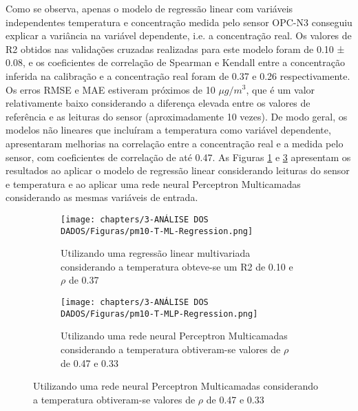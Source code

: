 Como se observa, apenas o modelo de regressão linear com variáveis independentes temperatura e concentração medida pelo sensor OPC-N3 conseguiu explicar a variância na variável dependente, i.e. a concentração real. Os valores de R2 obtidos nas validações cruzadas realizadas para este modelo foram de 0.10 ± 0.08, e os coeficientes de correlação de Spearman e Kendall entre a concentração inferida na calibração e a concentração real foram de 0.37 e 0.26 respectivamente. Os erros RMSE e MAE estiveram próximos de 10 \(\mu g/m^3\), que é um valor relativamente baixo considerando a diferença elevada entre os valores de referência e as leituras do sensor (aproximadamente 10 vezes). De modo geral, os modelos não lineares que incluíram a temperatura como variável dependente, apresentaram melhorias na correlação entre a concentração real e a medida pelo sensor, com coeficientes de correlação de até 0.47. As Figuras \ref{fig:data-pm10-T-reference-corr-MLR} e \ref{fig:data-pm10-T-reference-corr-MLP} apresentam os resultados ao aplicar o modelo de regressão linear considerando leituras do sensor e temperatura e ao aplicar uma rede neural Perceptron Multicamadas considerando as mesmas variáveis de entrada.

\begin{figure}[h]
    \centering
    \caption{Gráfico de dispersão das leituras do sensor de \acrshort{mp10} do OPC-N3 e a estação de referência após aplicar modelos de regressão considerando a temperatura}
    \begin{subfigure}{0.49\textwidth}
        \texttt{[image: chapters/3-ANÁLISE DOS DADOS/Figuras/pm10-T-ML-Regression.png]}
        \caption{Utilizando uma regressão linear multivariada considerando a temperatura obteve-se um R2 de 0.10 e $\rho$ de 0.37}
        \label{fig:data-pm10-T-reference-corr-MLR}
    \end{subfigure}
    \hfill
    \begin{subfigure}{0.49\textwidth}
        \texttt{[image: chapters/3-ANÁLISE DOS DADOS/Figuras/pm10-T-MLP-Regression.png]}
        \caption{Utilizando uma rede neural Perceptron Multicamadas considerando a temperatura obtiveram-se valores de $\rho$ de 0.47 e 0.33}
        \label{fig:data-pm10-T-reference-corr-MLP}
    \end{subfigure}
\end{figure}